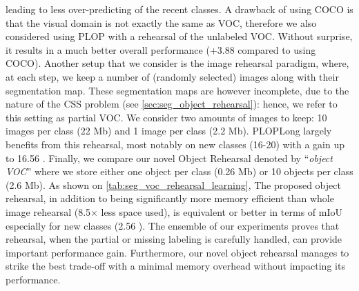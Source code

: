 leading to less over-predicting of the recent classes. A drawback of using COCO is that the visual
domain is not exactly the same as VOC, therefore we also considered using PLOP with a rehearsal of
the unlabeled VOC. Without surprise, it results in a much better overall performance (+3.88
\pp compared to using COCO). Another setup that we consider is the image rehearsal
paradigm, where, at each step, we keep a number of (randomly selected) images along with their
segmentation map. These segmentation maps are however incomplete, due to the nature of the \ac{CSS}
problem (see \autoref{sec:seg_object_rehearsal}): hence, we refer to this setting as partial VOC. We
consider two amounts of images to keep: 10 images per class (22 Mb) and 1 image per class (2.2 Mb).
PLOPLong largely benefits from this rehearsal, most notably on new classes (16-20) with a gain up to
16.56 \pp. Finally, we compare our novel Object Rehearsal denoted by ``\textit{object
    VOC}'' where we store either one object per class (0.26 Mb) or 10 objects per class (2.6 Mb). As
shown on \autoref{tab:seg_voc_rehearsal_learning}, The proposed object rehearsal, in addition to
being significantly more memory efficient than whole image rehearsal (8.5$\times$ less space used),
is equivalent or better in terms of \ac{mIoU} especially for new classes (2.56 \pp). The
ensemble of our experiments proves that rehearsal, when the partial or missing labeling is carefully
handled, can provide important performance gain. Furthermore, our novel object rehearsal manages to
strike the best trade-off with a minimal memory overhead without impacting its performance.

